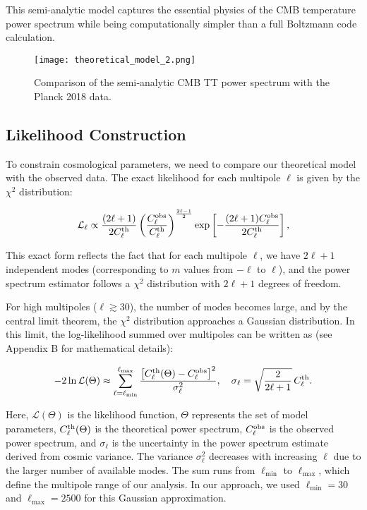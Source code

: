\documentclass[11pt]{article}
\theoremstyle{definition}
\begin{document}
This semi-analytic model captures the essential physics of the CMB temperature power spectrum while being computationally simpler than a full Boltzmann code calculation.

\begin{figure}[htbp]
  \centering
  \texttt{[image: theoretical\_model\_2.png]}
  \caption{Comparison of the semi‑analytic CMB TT power spectrum with the Planck 2018 data.}
  \label{fig:cmb-tt-comparison}
\end{figure}

\subsection{Likelihood Construction}
To constrain cosmological parameters, we need to compare our theoretical model with the observed data. The exact likelihood for each multipole $\ell$ is given by the $\chi^2$ distribution:

\begin{equation}
  \mathcal{L}_\ell \propto \frac{(2\ell+1)}{2C_\ell^{\rm th}} 
  \left(\frac{C_\ell^{\rm obs}}{C_\ell^{\rm th}}\right)^{\frac{2\ell-1}{2}} 
  \exp\left[-\frac{(2\ell+1)C_\ell^{\rm obs}}{2C_\ell^{\rm th}}\right],
\end{equation}

This exact form reflects the fact that for each multipole $\ell$, we have $2\ell+1$ independent modes (corresponding to $m$ values from $-\ell$ to $\ell$), and the power spectrum estimator follows a $\chi^2$ distribution with $2\ell+1$ degrees of freedom. 

For high multipoles ($\ell \gtrsim 30$), the number of modes becomes large, and by the central limit theorem, the $\chi^2$ distribution approaches a Gaussian distribution. In this limit, the log-likelihood summed over multipoles can be written as (see Appendix B for mathematical details):

\begin{equation}
  -2\ln\mathcal{L}(\Theta)
  \approx \sum_{\ell=\ell_{\min}}^{\ell_{\max}}
    \frac{\bigl[C_\ell^{\rm th}(\Theta)-C_\ell^{\rm obs}\bigr]^2}
         {\sigma_\ell^2},
  \quad
  \sigma_\ell = \sqrt{\frac{2}{2\ell+1}}\,C_\ell^{\rm th}.
\end{equation}

Here, $\mathcal{L}(\Theta)$ is the likelihood function, $\Theta$ represents the set of model parameters, $C_\ell^{\rm th}(\Theta)$ is the theoretical power spectrum, $C_\ell^{\rm obs}$ is the observed power spectrum, and $\sigma_\ell$ is the uncertainty in the power spectrum estimate derived from cosmic variance. The variance $\sigma_\ell^2$ decreases with increasing $\ell$ due to the larger number of available modes. The sum runs from $\ell_{\min}$ to $\ell_{\max}$, which define the multipole range of our analysis. In our approach, we used $\ell_{\min}=30$ and $\ell_{\max}=2500$ for this Gaussian approximation.
\end{document}
